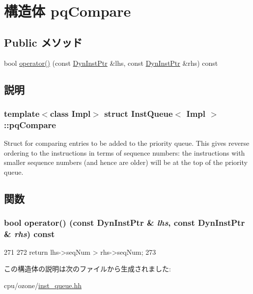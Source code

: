 \hypertarget{structInstQueue_1_1pqCompare}{
\section{構造体 pqCompare}
\label{structInstQueue_1_1pqCompare}
}
\subsection*{Public メソッド}
\begin{DoxyCompactItemize}
\item 
bool \hyperlink{structInstQueue_1_1pqCompare_aa171c804e811b84fcefef511a9031fb6}{operator()} (const \hyperlink{classInstQueue_a028ce10889c5f6450239d9e9a7347976}{DynInstPtr} \&lhs, const \hyperlink{classInstQueue_a028ce10889c5f6450239d9e9a7347976}{DynInstPtr} \&rhs) const 
\end{DoxyCompactItemize}


\subsection{説明}
\subsubsection*{template$<$class Impl$>$ struct InstQueue$<$ Impl $>$::pqCompare}

Struct for comparing entries to be added to the priority queue. This gives reverse ordering to the instructions in terms of sequence numbers: the instructions with smaller sequence numbers (and hence are older) will be at the top of the priority queue. 

\subsection{関数}
\hypertarget{structInstQueue_1_1pqCompare_aa171c804e811b84fcefef511a9031fb6}{
\subsubsection[{operator()}]{\setlength{\rightskip}{0pt plus 5cm}bool operator() (const {\bf DynInstPtr} \& {\em lhs}, \/  const {\bf DynInstPtr} \& {\em rhs}) const}}
\label{structInstQueue_1_1pqCompare_aa171c804e811b84fcefef511a9031fb6}



\begin{DoxyCode}
271         {
272             return lhs->seqNum > rhs->seqNum;
273         }
\end{DoxyCode}


この構造体の説明は次のファイルから生成されました:\begin{DoxyCompactItemize}
\item 
cpu/ozone/\hyperlink{ozone_2inst__queue_8hh}{inst\_\-queue.hh}\end{DoxyCompactItemize}
